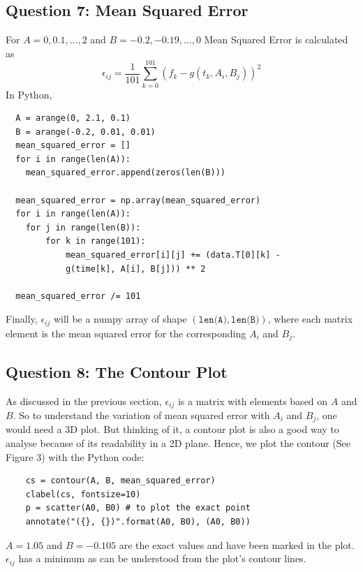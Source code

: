 \documentclass[11pt, a4paper]{article}
\begin{document}
  
  \subsection{Question 7: Mean Squared Error}
  For $A=0,0.1,\ldots,2$ and $B=-0.2,-0.19,\ldots,0$ Mean Squared Error is calculated as 
  $$\epsilon _{ij}=\frac{1}{101}\sum_{k=0}^{101}(f_{k}-g(t_{k}, A_{i}, B_{j}))^2 $$
   In Python,
  
  \begin{verbatim}
  A = arange(0, 2.1, 0.1)
  B = arange(-0.2, 0.01, 0.01)
  mean_squared_error = []
  for i in range(len(A)):
    mean_squared_error.append(zeros(len(B)))

  mean_squared_error = np.array(mean_squared_error)
  for i in range(len(A)):
    for j in range(len(B)):
        for k in range(101):
            mean_squared_error[i][j] += (data.T[0][k] - 
            g(time[k], A[i], B[j])) ** 2

  mean_squared_error /= 101
  \end{verbatim}
  Finally, $\epsilon _{ij}$ will be a numpy array of shape $(\texttt{len(A)}, \texttt{len(B)})$, where each matrix element is the mean squared error for the corresponding $A_{i}$ and $B_{j}$.
  
  \subsection{Question 8: The Contour Plot}
	As discussed in the previous section, $\epsilon_{ij}$ is a matrix with elements based on $A$ and $B$. So to understand the variation of mean squared error with $A_{i}$ and $B_{j}$, one would need a 3D plot. But thinking of it, a contour plot is also a good way to analyse because of its readability in a 2D plane. Hence, we plot the contour (See Figure 3) with the Python code:       
    \begin{verbatim}
    cs = contour(A, B, mean_squared_error)
    clabel(cs, fontsize=10)
    p = scatter(A0, B0) # to plot the exact point
    annotate("({}, {})".format(A0, B0), (A0, B0))
    \end{verbatim}
    $A=1.05$ and $B=-0.105$ are the exact values and have been marked in the plot. $\epsilon _{ij}$ has a minimum as can be understood from the plot's contour lines.
    
\end{document}

